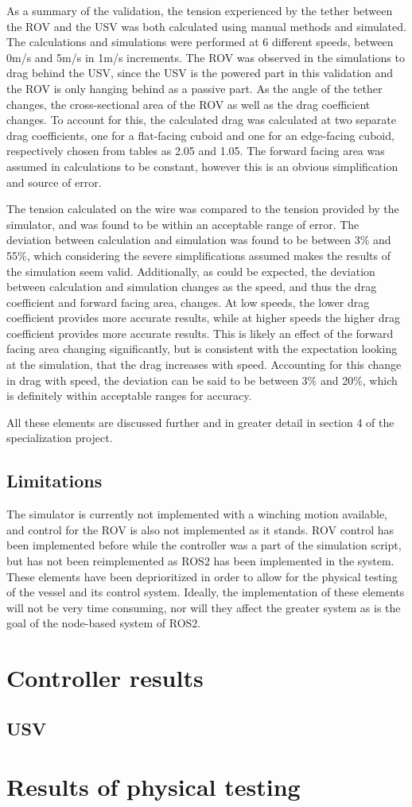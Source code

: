 \documentclass[class=article, crop=false]{standalone}
\begin{document}
As a summary of the validation, the tension experienced by the tether between the ROV and the USV was both calculated using manual methods and simulated. The calculations and simulations were performed at 6 different speeds, between 0m/s and 5m/s in 1m/s increments. The ROV was observed in the simulations to drag behind the USV, since the USV is the powered part in this validation and the ROV is only hanging behind as a passive part. As the angle of the tether changes, the cross-sectional area of the ROV as well as the drag coefficient changes. To account for this, the calculated drag was calculated at two separate drag coefficients, one for a flat-facing cuboid and one for an edge-facing cuboid, respectively chosen from tables as 2.05 and 1.05. The forward facing area was assumed in calculations to be constant, however this is an obvious simplification and source of error.

The tension calculated on the wire was compared to the tension provided by the simulator, and was found to be within an acceptable range of error. The deviation between calculation and simulation was found to be between 3\% and 55\%, which considering the severe simplifications assumed makes the results of the simulation seem valid. Additionally, as could be expected, the deviation between calculation and simulation changes as the speed, and thus the drag coefficient and forward facing area, changes. At low speeds, the lower drag coefficient provides more accurate results, while at higher speeds the higher drag coefficient provides more accurate results. This is likely an effect of the forward facing area changing significantly, but is consistent with the expectation looking at the simulation, that the drag increases with speed. Accounting for this change in drag with speed, the deviation can be said to be between 3\% and 20\%, which is definitely within acceptable ranges for accuracy.

All these elements are discussed further and in greater detail in section 4 of the specialization project.

\subsection{Limitations}
The simulator is currently not implemented with a winching motion available, and control for the ROV is also not implemented as it stands. ROV control has been implemented before while the controller was a part of the simulation script, but has not been reimplemented as ROS2 has been implemented in the system. These elements have been deprioritized in order to allow for the physical testing of the vessel and its control system. Ideally, the implementation of these elements will not be very time consuming, nor will they affect the greater system as is the goal of the node-based system of ROS2.

\section{Controller results}

\subsection{USV}



\section{Results of physical testing}
\end{document}
